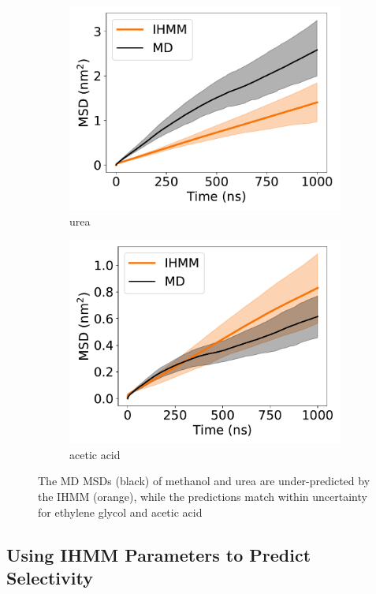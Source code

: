 \documentclass[journal=jpcbfk,manuscript=article]{achemso}
\begin{document}
\begin{figure}
\begin{subfigure}{0.24\textwidth}
  \includegraphics[width=\textwidth]{unclustered_msd_URE.pdf}
  \caption{urea}\label{fig:unclustered_msd_URE}
  \end{subfigure}
  \begin{subfigure}{0.24\textwidth}
  \includegraphics[width=\textwidth]{unclustered_msd_ACH.pdf}
  \caption{acetic acid}\label{fig:unclustered_msd_ACH}
  \end{subfigure}
  \caption{The MD MSDs (black) of methanol and urea are under-predicted by 
  the IHMM (orange), while the predictions match within uncertainty for ethylene
  glycol and acetic acid}\label{fig:unclustered_msds}
  \end{figure}
  
  \subsection{Using IHMM Parameters to Predict Selectivity}\label{section:macroscopic_properties}
  
\end{document}
